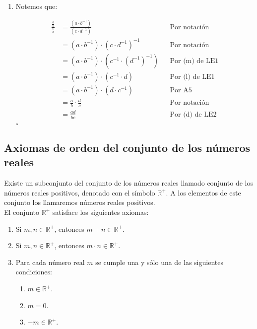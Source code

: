 \documentclass[11pt]{article}
\begin{document}
\begin{enumerate}[label=\alph*),font=\bfseries]
\pagebreak

\item Notemos que:

\begin{align*}
    \frac{\frac{a}{b}}{\frac{c}{d}} &= \frac{\left( a \cdot b^{-1} \right)}{\left( c \cdot d^{-1} \right)} && \text{Por notación}\\
    &= \left( a \cdot b^{-1} \right) \cdot \left( c \cdot d^{-1} \right)^{-1} && \text{Por notación}\\
    &= \left( a \cdot b^{-1} \right) \cdot \left( c^{-1} \cdot \left( d^{-1} \right) ^{-1} \right) && \text{Por (m) de LE1}\\
    &= \left( a \cdot b^{-1} \right) \cdot \left( c^{-1} \cdot d \right) && \text{Por (l) de LE1}\\
    &= \left( a \cdot b^{-1} \right) \cdot \left( d \cdot c^{-1} \right) && \text{Por A5}\\
    &= \frac{a}{b} \cdot \frac{d}{c} && \text{Por notación}\\
    &= \frac{ad}{bc} && \text{Por (d) de LE2}\\
\end{align*}
\mbox{}\hfill $\square$

\end{enumerate}

\subsection*{Axiomas de orden del conjunto de los números reales}

Existe un subconjunto del conjunto de los números reales llamado conjunto de los números reales positivos, denotado con el símbolo $\mathbb{R}^+$. A los elementos de este conjunto los llamaremos números reales positivos.\\
El conjunto $\mathbb{R}^+$ satisface los siguientes axiomas:

\begin{enumerate}[label=O\arabic*), font=\bfseries]
    \item Si $m, n \in \mathbb{R}^+$, entonces $m + n \in \mathbb{R}^+$.
    \item Si $m, n \in \mathbb{R}^+$, entonces $m \cdot n \in \mathbb{R}^+$.
    \item Para cada número real $m$ se cumple una y sólo una de las siguientes condiciones: \label{tricotomía}
	\begin{enumerate}[label=\roman*), font=\bfseries]
    \item $m \in \mathbb{R}^+$.
    \item $m = 0$.
    \item $-m \in \mathbb{R}^+$.\
    \end{enumerate}
\end{enumerate}
\end{document}
